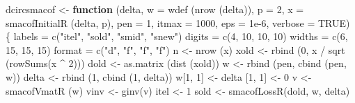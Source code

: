 \documentclass[
  12pt,
]{book}
\newenvironment{Shaded}{\begin{snugshade}}{\end{snugshade}}
\newcommand{\AttributeTok}[1]{\textcolor[rgb]{0.77,0.63,0.00}{#1}}
\newcommand{\ConstantTok}[1]{\textcolor[rgb]{0.00,0.00,0.00}{#1}}
\newcommand{\ControlFlowTok}[1]{\textcolor[rgb]{0.13,0.29,0.53}{\textbf{#1}}}
\newcommand{\DecValTok}[1]{\textcolor[rgb]{0.00,0.00,0.81}{#1}}
\newcommand{\FloatTok}[1]{\textcolor[rgb]{0.00,0.00,0.81}{#1}}
\newcommand{\FunctionTok}[1]{\textcolor[rgb]{0.00,0.00,0.00}{#1}}
\newcommand{\NormalTok}[1]{#1}
\newcommand{\OtherTok}[1]{\textcolor[rgb]{0.56,0.35,0.01}{#1}}
\newcommand{\SpecialCharTok}[1]{\textcolor[rgb]{0.00,0.00,0.00}{#1}}
\newcommand{\StringTok}[1]{\textcolor[rgb]{0.31,0.60,0.02}{#1}}
\theoremstyle{definition}
\theoremstyle{definition}
\theoremstyle{definition}
\theoremstyle{definition}
\theoremstyle{remark}
\begin{document}
\begin{Shaded}
\begin{Highlighting}[]
\NormalTok{dcircsmacof }\OtherTok{\textless{}{-}}
  \ControlFlowTok{function}\NormalTok{ (delta,}
            \AttributeTok{w =} \FunctionTok{wdef}\NormalTok{ (}\FunctionTok{nrow}\NormalTok{ (delta)),}
            \AttributeTok{p =} \DecValTok{2}\NormalTok{,}
            \AttributeTok{x =} \FunctionTok{smacofInitialR}\NormalTok{ (delta, p),}
            \AttributeTok{pen =} \DecValTok{1}\NormalTok{,}
            \AttributeTok{itmax =} \DecValTok{1000}\NormalTok{,}
            \AttributeTok{eps =} \FloatTok{1e{-}6}\NormalTok{,}
            \AttributeTok{verbose =} \ConstantTok{TRUE}\NormalTok{) \{}
\NormalTok{    labels }\OtherTok{=} \FunctionTok{c}\NormalTok{(}\StringTok{"itel"}\NormalTok{, }\StringTok{"sold"}\NormalTok{, }\StringTok{"smid"}\NormalTok{, }\StringTok{"snew"}\NormalTok{)}
\NormalTok{    digits }\OtherTok{=} \FunctionTok{c}\NormalTok{(}\DecValTok{4}\NormalTok{, }\DecValTok{10}\NormalTok{, }\DecValTok{10}\NormalTok{, }\DecValTok{10}\NormalTok{)}
\NormalTok{    widths }\OtherTok{=} \FunctionTok{c}\NormalTok{(}\DecValTok{6}\NormalTok{, }\DecValTok{15}\NormalTok{, }\DecValTok{15}\NormalTok{, }\DecValTok{15}\NormalTok{)}
\NormalTok{    format }\OtherTok{=} \FunctionTok{c}\NormalTok{(}\StringTok{"d"}\NormalTok{, }\StringTok{"f"}\NormalTok{, }\StringTok{"f"}\NormalTok{, }\StringTok{"f"}\NormalTok{)}
\NormalTok{    n }\OtherTok{\textless{}{-}} \FunctionTok{nrow}\NormalTok{ (x)}
\NormalTok{    xold }\OtherTok{\textless{}{-}}
      \FunctionTok{rbind}\NormalTok{ (}\DecValTok{0}\NormalTok{, x }\SpecialCharTok{/} \FunctionTok{sqrt}\NormalTok{ (}\FunctionTok{rowSums}\NormalTok{(x }\SpecialCharTok{\^{}} \DecValTok{2}\NormalTok{)))}
\NormalTok{    dold }\OtherTok{\textless{}{-}} \FunctionTok{as.matrix}\NormalTok{ (}\FunctionTok{dist}\NormalTok{ (xold))}
\NormalTok{    w }\OtherTok{\textless{}{-}} \FunctionTok{rbind}\NormalTok{ (pen, }\FunctionTok{cbind}\NormalTok{ (pen, w))}
\NormalTok{    delta }\OtherTok{\textless{}{-}} \FunctionTok{rbind}\NormalTok{ (}\DecValTok{1}\NormalTok{, }\FunctionTok{cbind}\NormalTok{ (}\DecValTok{1}\NormalTok{, delta))}
\NormalTok{    w[}\DecValTok{1}\NormalTok{, }\DecValTok{1}\NormalTok{] }\OtherTok{\textless{}{-}}\NormalTok{ delta [}\DecValTok{1}\NormalTok{, }\DecValTok{1}\NormalTok{] }\OtherTok{\textless{}{-}} \DecValTok{0}
\NormalTok{    v }\OtherTok{\textless{}{-}} \FunctionTok{smacofVmatR}\NormalTok{ (w)}
\NormalTok{    vinv }\OtherTok{\textless{}{-}} \FunctionTok{ginv}\NormalTok{(v)}
\NormalTok{    itel }\OtherTok{\textless{}{-}} \DecValTok{1}
\NormalTok{    sold }\OtherTok{\textless{}{-}} \FunctionTok{smacofLossR}\NormalTok{(dold, w, delta)}

\end{Highlighting}
\end{Shaded}
\end{document}
